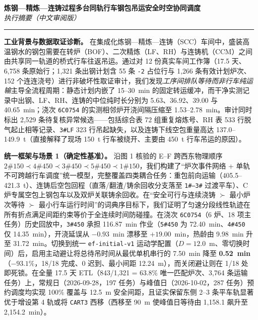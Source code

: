 \documentclass[11pt,a4paper,UTF8]{ctexart}
\begin{document}
\thispagestyle{empty}
\begin{center}
  {\Large \textbf{炼钢—精炼—连铸过程多台同轨行车钢包吊运安全时空协同调度}}\\[0.25em]
  {\normalsize \textit{执行摘要（中文审阅版）}}
\end{center}
\vspace{0.1em}
\hrule
\vspace{0.4em}
{\small
\noindent\textbf{工业背景与数据取证诊断。}
在集成化炼钢—精炼—连铸（SCC）车间中，盛装高温钢水的钢包需要在转炉（BOF）、二次精炼（LF、RH）与连铸机（CCM）之间由共享同一轨道的桥式行车往返吊运。通过对 12 份真实车间工作簿（17.5 天、6,758 条原始行；1,321 条出钢计划含 55 条 \texttt{-2} 占位行与 1,266 条有效计划炉次、152 个连连浇号）进行非破坏性取证审计，我们发现\emph{工序间排队等待而非行车纯运输}主导全流程周期：静态计划内嵌了 15--30~min 的固定转运缓冲，而干净实测记录中出钢、LF、RH、连铸的中位纯时长分别为 5.63、36.92、39.00 与 40.65~min；浇次 \texttt{6C0754} 的实测相邻炉开浇间隔压缩至 1.53--2.78~min。审计同时标出 2,529 条待复核异常候选——包括综合表 72 组重复熔炼号、RH 表 533 行脱气起止相等记录、\texttt{3\#LF} 323 行吊起缺失，以及连铸下线空包重量高达 137.0--149.9~t（直接解释了现场 150~t 行车被绕开、主要由 450~t 行车吊运的原因）。

\noindent\textbf{统一框架与场景 1（确定性基准）。}
沿图 1 核验的 E--F 跨西东物理顺序 $\text{2\#150} \prec \text{4\#450} \prec \text{3\#450} \prec \text{5\#450} \prec \text{1\#150}$，我们构建了“炉次事件网络 + 单轨不可跨越行车调度”统一模型，完整覆盖四类耦合任务：重包前向运输（405.5--421.3~t）、连铸后空包回程（直落/翻渣/铸余回收分支落至 \texttt{1\#--3\#} 过渡平车）、C 炉专属空包上钢包车以及双炉关联铸余回收。在“安全可行与连续浇铸 $\succ$ 最小炉次等待 $\succ$ 最小行车运行时间”的词典序目标下，我们证明了匀速分段线性轨迹在所有折点满足间距约束等价于全连续时间防碰撞。在浇次 \texttt{6C0754}（6 炉、18 项主任务）历史回放中，\texttt{3\#450} 承担 116.87~min 作业（\texttt{5\#450} 为 72.40~min、\texttt{4\#450} 仅 14.35~min），开浇延误从 $-0.93$~min 漂移至 $+19.00$~min，热龄由 9.98~min 升至 31.72~min。切换到统一 \texttt{ef-initial-v1} 运动学配置（$D=12.0$~m、零切换时间）后，启用主动避让将总待吊时间从最优单机串行的 7.50~min 降至 \textbf{0.52~min}（\textbf{$-93.1\%$}，18/18 完成、0 迟到、最小间距 12.24~m），而关闭避让则在 1/18 处即死锁。在全量 17.5 天 ETL（843/1,321 = 63.8\% 唯一匹配炉次、3,764 条运输任务）上，常规日（2026-09-28，197 任务）与峰值日（2026-10-02，287 任务）预约调度均实现 100\% 覆盖与 12.5~m 安全间距，且证实保留东侧 2--3 条平车轨显著优于增设第 4 轨或将 \texttt{CART3} 西移（西移至 90~m 使峰值日等待由 1,158.1 飙升至 2,154.2~min）。

}
\end{document}
